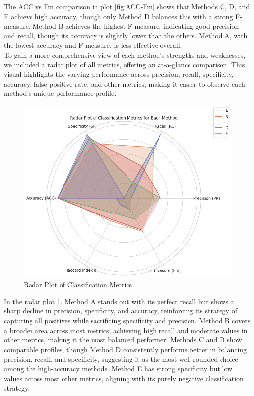 \documentclass{article}
\begin{document}
The ACC vs Fm comparison in plot \ref{fig:ACC-Fm} shows that Methods C, D, and E achieve high accuracy, though only Method D balances this with a strong F-measure. Method B achieves the highest F-measure, indicating good precision and recall, though its accuracy is slightly lower than the others. Method A, with the lowest accuracy and F-measure, is less effective overall.
\\

To gain a more comprehensive view of each method's strengths and weaknesses, we included a radar plot of all metrics, offering an at-a-glance comparison. This visual highlights the varying performance across precision, recall, specificity, accuracy, false positive rate, and other metrics, making it easier to observe each method’s unique performance profile.
\\

\begin{figure}[H]
	
	\centering
	\includegraphics[width=.7\textwidth]{images/radar.png}
	\caption{Radar Plot of Classification Metrics}
	\label{fig:radar}
\end{figure}

In the radar plot \ref{fig:radar}, Method A stands out with its perfect recall but shows a sharp decline in precision, specificity, and accuracy, reinforcing its strategy of capturing all positives while sacrificing specificity and precision. Method B covers a broader area across most metrics, achieving high recall and moderate values in other metrics, making it the most balanced performer. Methods C and D show comparable profiles, though Method D consistently performs better in balancing precision, recall, and specificity, suggesting it as the most well-rounded choice among the high-accuracy methods. Method E has strong specificity but low values across most other metrics, aligning with its purely negative classification strategy.
\\
\end{document}
